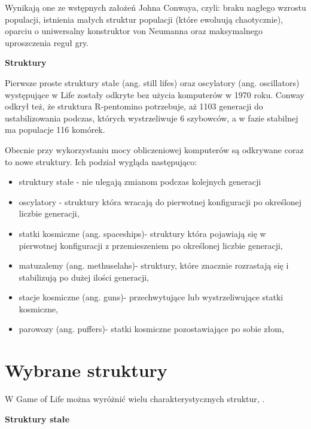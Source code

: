 \documentclass[a4paper, 10pt]{article}
\newcommand{\ang}[1]{(ang. #1\/)}
\begin{document}
Wynikają one ze wstępnych założeń Johna Conwaya, czyli: braku nagłego wzrostu populacji, istnienia małych struktur populacji (które ewoluują chaotycznie),
oparciu o uniwersalny konstruktor von Neumanna \cite{vnc} oraz maksymalnego uproszczenia reguł gry.

{\bf{Struktury}}
 
Pierwsze proste struktury stałe \ang{still lifes} oraz oscylatory \ang{oscillators} występujące w Life zostały odkryte bez użycia komputerów w 1970 roku. 
Conway odkrył też, że struktura R-pentomino potrzebuje, aż 1103 generacji do ustabilizowania podczas, których wystrzeliwuje 6 szybowców, 
a w fazie stabilnej ma populacje 116 komórek. 

Obecnie przy wykorzystaniu mocy obliczeniowej komputerów są odkrywane coraz to nowe struktury. Ich podział wygląda następująco:

\begin{itemize}
  \item struktury stałe - nie ulegają zmianom podczas kolejnych generacji
  \item oscylatory - struktury która wracają do pierwotnej konfiguracji po określonej liczbie generacji,
  \item statki kosmiczne \ang{spaceships}- struktury która pojawiają się w pierwotnej konfiguracji z przemieszeniem po określonej liczbie generacji,
  \item matuzalemy \ang{methuselahs}- struktury, które znacznie rozrastają się i stabilizują po dużej ilości generacji,
  \item stacje kosmiczne \ang{guns}- przechwytujące lub wystrzeliwujące statki kosmiczne,
  \item parowozy \ang{puffers}- statki kosmiczne pozostawiające po sobie złom,
  
\end{itemize}

 



\newpage

\section{Wybrane struktury}


W Game of Life można wyróżnić wielu charakterystycznych struktur, .


{\bf{Struktury stałe}}


 \begin{figure}[ht]
  
  
	\centering
	\quad
 	
	
 \end{figure}
 
\end{document}
